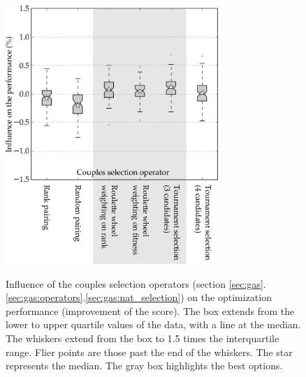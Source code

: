 \documentclass{ametsoc}
\begin{document}
\begin{figure}[t]
	\begin{center}
		\noindent\includegraphics[width=19pc,angle=0]{fig04.pdf}\\
	\end{center}
	\caption{Influence of the couples selection operators (section \ref{sec:gas}.\ref{sec:gas:operators}.\ref{sec:gas:nat_selection}) on the optimization performance (improvement of the score). The box extends from the lower to upper quartile values of the data, with a line at the median. The whiskers extend from the box to 1.5 times the interquartile range. Flier points are those past the end of the whiskers. The star represents the median. The gray box highlights the best options.}
	\label{fig:operator_selectcoupl_score}
\end{figure}
\end{document}
